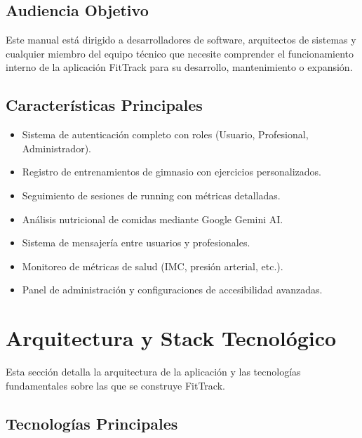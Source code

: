 \documentclass[12pt,a4paper]{article}
\begin{document}
\subsection{Audiencia Objetivo}
Este manual está dirigido a desarrolladores de software, arquitectos de sistemas y cualquier miembro del equipo técnico que necesite comprender el funcionamiento interno de la aplicación FitTrack para su desarrollo, mantenimiento o expansión.

\subsection{Características Principales}
\begin{itemize}
    \item Sistema de autenticación completo con roles (Usuario, Profesional, Administrador).
    \item Registro de entrenamientos de gimnasio con ejercicios personalizados.
    \item Seguimiento de sesiones de running con métricas detalladas.
    \item Análisis nutricional de comidas mediante Google Gemini AI.
    \item Sistema de mensajería entre usuarios y profesionales.
    \item Monitoreo de métricas de salud (IMC, presión arterial, etc.).
    \item Panel de administración y configuraciones de accesibilidad avanzadas.
\end{itemize}

\section{Arquitectura y Stack Tecnológico}

Esta sección detalla la arquitectura de la aplicación y las tecnologías fundamentales sobre las que se construye FitTrack.

\subsection{Tecnologías Principales}
\end{document}
